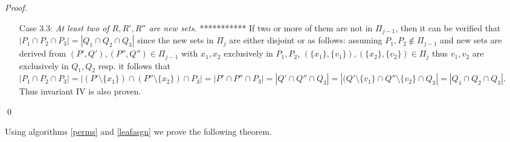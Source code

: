 \documentclass{llncs}
\begin{document}
\begin{proof}
\begin{enumerate}
\begin{enumerate}
    \item [Case 3.3:] {\em At least two of $R, R', R''$ are new sets.}
 ***********       If two or more of them are not in $\Pi_{j-1}$, then it can
  be verified that $|P_1
  \cap P_2 \cap P_3| = |Q_1 \cap Q_2 \cap Q_3|$ since the new sets
  in $\Pi_j$ are either disjoint or as follows: assuming $P_1, P_2
  \notin \Pi_{j-1}$ and new sets are derived from $(P', Q'), (P'', Q'') \in
  \Pi_{j-1}$ with $x_1, x_2$
  exclusively in $P_1, P_2$, $(\{x_1\},\{v_1\}), (\{x_2\},\{v_2\})
  \in \Pi_j $ thus $v_1, v_2$ are exclusively in $Q_1, Q_2$ resp. it
  follows that
$|P_1
  \cap P_2 \cap P_3| = |(P' \setminus \{x_1\}) \cap (P'' \setminus
  \{x_2\}) \cap P_3| = |P' \cap P'' \cap P_3| = |Q' \cap Q'' \cap Q_3|
  = |(Q' \setminus \{v_1\} \cap Q'' \setminus \{v_2\} \cap Q_3| =
  |Q_1 \cap Q_2 \cap Q_3|$. Thus invariant
  IV is also proven.

    \end{enumerate}
  \end{enumerate} \qed
\end{proof}

\noindent
Using algorithms \ref{perms} and \ref{leafasgn} we prove the following
theorem.
\end{document}

